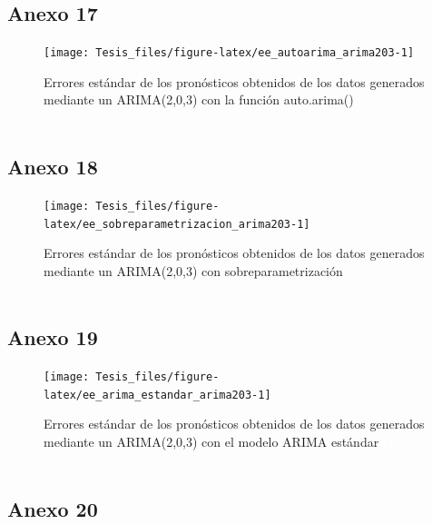 \documentclass[
]{article}
\begin{document}
\subsection{Anexo 17}

\begin{figure}[H]
\texttt{[image: Tesis\_files/figure-latex/ee\_autoarima\_arima203-1]} \caption{Errores estándar de los pronósticos obtenidos de los datos generados mediante un ARIMA(2,0,3) con la función auto.arima() \textcolor{white}{prueba de aaaaaaaaaaaaaaaaaaaaaaa}}\label{fig:ee_autoarima_arima203}
\end{figure}

\subsection{Anexo 18}

\begin{figure}[H]
\texttt{[image: Tesis\_files/figure-latex/ee\_sobreparametrizacion\_arima203-1]} \caption{Errores estándar de los pronósticos obtenidos de los datos generados mediante un ARIMA(2,0,3) con sobreparametrización \textcolor{white}{prueba de aaaaaaaaaaaaaaaaaaaaaaa}}\label{fig:ee_sobreparametrizacion_arima203}
\end{figure}

\subsection{Anexo 19}

\begin{figure}[H]
\texttt{[image: Tesis\_files/figure-latex/ee\_arima\_estandar\_arima203-1]} \caption{Errores estándar de los pronósticos obtenidos de los datos generados mediante un ARIMA(2,0,3) con el modelo ARIMA estándar \textcolor{white}{prueba de aaaaaaaaaaaaaaaaaaaaaaa}}\label{fig:ee_arima_estandar_arima203}
\end{figure}

\subsection{Anexo 20}
\end{document}
